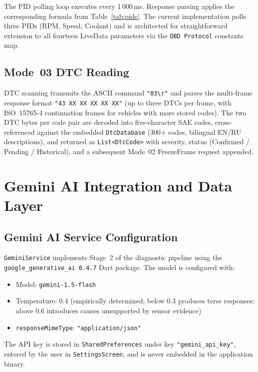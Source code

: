 The PID polling loop executes every 1\,000\,ms.
Response parsing applies the corresponding formula from Table~\ref{tab:pids}.
The current implementation polls three PIDs (RPM, Speed, Coolant) and is architected for straightforward extension to all fourteen LiveData parameters via the \texttt{OBD Protocol} constants map.

\subsection{Mode~03 DTC Reading}

DTC scanning transmits the ASCII command \texttt{"03\textbackslash r"} and parses the multi-frame response format \texttt{"43 XX XX XX XX XX"} (up to three DTCs per frame, with ISO~15765-4 continuation frames for vehicles with more stored codes).
The two DTC bytes per code pair are decoded into five-character SAE codes, cross-referenced against the embedded \texttt{DtcDatabase} (300+ codes, bilingual EN/RU descriptions), and returned as \texttt{List<DtcCode>} with severity, status (Confirmed / Pending / Historical), and a subsequent Mode~02 FreezeFrame request appended.

\section{Gemini AI Integration and Data Layer}
\label{sec:gemini}

\subsection{Gemini AI Service Configuration}

\texttt{GeminiService} implements Stage~2 of the diagnostic pipeline using the \texttt{google\_generative\_ai~0.4.7} Dart package.
The model is configured with:
\begin{itemize}
  \item Model: \texttt{gemini-1.5-flash}
  \item Temperature: 0.4 (empirically determined; below 0.3 produces terse responses; above 0.6 introduces causes unsupported by sensor evidence)
  \item \texttt{responseMimeType}: \texttt{"application/json"}
\end{itemize}

The API key is stored in \texttt{SharedPreferences} under key \texttt{"gemini\_api\_key"}, entered by the user in \texttt{SettingsScreen}, and is never embedded in the application binary.

